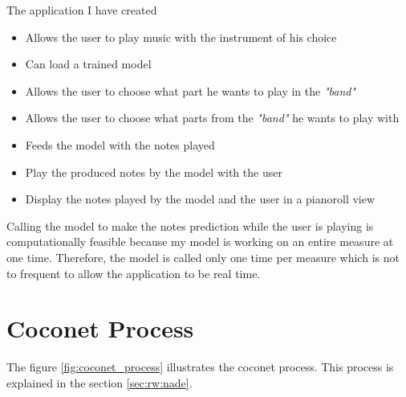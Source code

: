 \documentclass[12pt]{report}
\begin{document}
The application I have created
\begin{itemize}
    \item Allows the user to play music with the instrument of his choice
    \item Can load a trained model
    \item Allows the user to choose what part he wants to play in the \textit{"band"}
    \item Allows the user to choose what parts from the \textit{"band"} he wants to play with
    \item Feeds the model with the notes played 
    \item Play the produced notes by the model with the user
    \item Display the notes played by the model and the user in a pianoroll view
\end{itemize}

Calling the model to make the notes prediction while the user is playing is computationally feasible because my model is working on an entire measure at one time.
Therefore, the model is called only one time per measure which is not to frequent to allow the application to be real time.


\section{Coconet Process}
\label{appendix:coconet_process}

The figure \ref{fig:coconet_process} illustrates the coconet process.
This process is explained in the section \ref{sec:rw:nade}.
\end{document}
